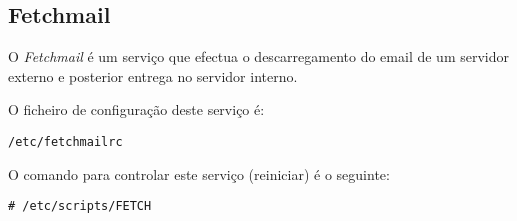 \subsection{Fetchmail}

O \emph{Fetchmail} é um serviço que efectua o descarregamento do email de um servidor externo e posterior entrega no servidor interno.

O ficheiro de configuração deste serviço é:

\begin{Verbatim}[commandchars=\\\{\}]
/etc/fetchmailrc
\end{Verbatim}

O comando para controlar este serviço (reiniciar) é o seguinte:

\begin{Verbatim}[commandchars=\\\{\}]
# /etc/scripts/FETCH
\end{Verbatim}


